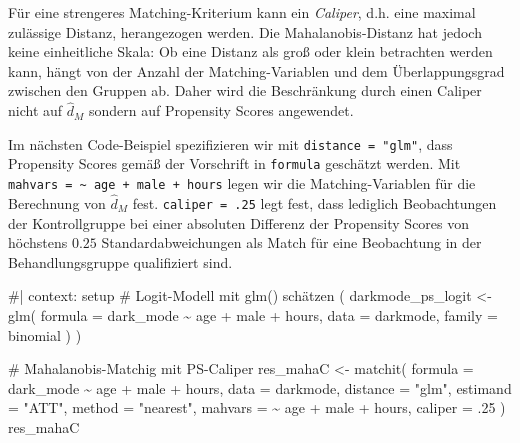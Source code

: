 \documentclass[
  a4paper,
  DIV=11,
  oneside]{scrreprt}
\newenvironment{Shaded}{\begin{snugshade}}{\end{snugshade}}
\newcommand{\AttributeTok}[1]{\textcolor[rgb]{0.40,0.45,0.13}{#1}}
\newcommand{\CommentTok}[1]{\textcolor[rgb]{0.37,0.37,0.37}{#1}}
\newcommand{\DecValTok}[1]{\textcolor[rgb]{0.68,0.00,0.00}{#1}}
\newcommand{\FunctionTok}[1]{\textcolor[rgb]{0.28,0.35,0.67}{#1}}
\newcommand{\NormalTok}[1]{\textcolor[rgb]{0.00,0.23,0.31}{#1}}
\newcommand{\OtherTok}[1]{\textcolor[rgb]{0.00,0.23,0.31}{#1}}
\newcommand{\SpecialCharTok}[1]{\textcolor[rgb]{0.37,0.37,0.37}{#1}}
\newcommand{\StringTok}[1]{\textcolor[rgb]{0.13,0.47,0.30}{#1}}
\begin{document}
Für eine strengeres Matching-Kriterium kann ein \emph{Caliper}, d.h.
eine maximal zulässige Distanz, herangezogen werden. Die
Mahalanobis-Distanz hat jedoch keine einheitliche Skala: Ob eine Distanz
als groß oder klein betrachten werden kann, hängt von der Anzahl der
Matching-Variablen und dem Überlappungsgrad zwischen den Gruppen ab.
Daher wird die Beschränkung durch einen Caliper nicht auf
\(\widehat{d}_M\) sondern auf Propensity Scores angewendet.

Im nächsten Code-Beispiel spezifizieren wir mit
\texttt{distance\ =\ "glm"}, dass Propensity Scores gemäß der Vorschrift
in \texttt{formula} geschätzt werden. Mit
\texttt{mahvars\ =\ \textasciitilde{}\ age\ +\ male\ +\ hours} legen wir
die Matching-Variablen für die Berechnung von \(\widehat{d}_M\) fest.
\texttt{caliper\ =\ .25} legt fest, dass lediglich Beobachtungen der
Kontrollgruppe bei einer absoluten Differenz der Propensity Scores von
höchstens \(0.25\) Standardabweichungen als Match für eine Beobachtung
in der Behandlungsgruppe qualifiziert sind.

\begin{Shaded}
\begin{Highlighting}[]
\NormalTok{\#| context: setup}
\NormalTok{\# Logit{-}Modell mit \textquotesingle{}glm()\textquotesingle{} schätzen}
\NormalTok{(}
\NormalTok{  darkmode\_ps\_logit \textless{}{-} glm(}
\NormalTok{    formula = dark\_mode \textasciitilde{} age + male + hours,}
\NormalTok{    data = darkmode,}
\NormalTok{    family = binomial}
\NormalTok{  )}
\NormalTok{)}
\end{Highlighting}
\end{Shaded}

\begin{Shaded}
\begin{Highlighting}[]
\CommentTok{\# Mahalanobis{-}Matchig mit PS{-}Caliper}
\NormalTok{res\_mahaC }\OtherTok{\textless{}{-}} \FunctionTok{matchit}\NormalTok{(}
  \AttributeTok{formula =}\NormalTok{ dark\_mode }\SpecialCharTok{\textasciitilde{}}\NormalTok{ age }\SpecialCharTok{+}\NormalTok{ male }\SpecialCharTok{+}\NormalTok{ hours, }
  \AttributeTok{data =}\NormalTok{ darkmode, }
  \AttributeTok{distance =} \StringTok{"glm"}\NormalTok{,}
  \AttributeTok{estimand =} \StringTok{"ATT"}\NormalTok{,}
  \AttributeTok{method =} \StringTok{"nearest"}\NormalTok{,}
  \AttributeTok{mahvars =} \SpecialCharTok{\textasciitilde{}}\NormalTok{ age }\SpecialCharTok{+}\NormalTok{ male }\SpecialCharTok{+}\NormalTok{ hours,}
  \AttributeTok{caliper =}\NormalTok{ .}\DecValTok{25}
\NormalTok{)}
\NormalTok{res\_mahaC}
\end{Highlighting}
\end{Shaded}
\end{document}
